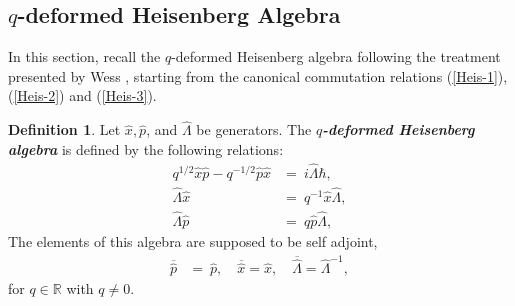 \documentclass[12pt,a4paper]{article}
\theoremstyle{plain}
\newtheorem{proposition}[theorem]{Proposition}
\theoremstyle{definition}
\newtheorem{definition}[theorem]{Definition}
\theoremstyle{remark}
\begin{document}
\subsection{\texorpdfstring{$q$}{Lg}-deformed Heisenberg Algebra}\label{juwess}

In this section, recall the $q$-deformed Heisenberg algebra following the treatment presented by Wess \cite{Wess2000}, starting from the canonical commutation relations (\ref{Heis-1}), (\ref{Heis-2}) and (\ref{Heis-3}).

\begin{definition}\cite{Wess2000}\label{Wess-def} Let $\hat{x},\hat{p}$, and $\hat{\Lambda}$ be generators. The \textit{\textbf{$q$-deformed Heisenberg algebra}} is defined by the following relations: 
\begin{align} \label{17}
q^{1/2}\hat{x}\hat{p}-q^{-1/2}\hat{p}\hat{x} & = \ i\hat{\Lambda}\hbar ,\\
\label{wess2}\hat{\Lambda} \hat{x} & = \ q^{-1}\hat{x}\hat{\Lambda}, \\
\label{wess3}\hat{\Lambda} \hat{p}  & = \ q\hat{p}\hat{\Lambda}, 
\end{align} 
The elements of this algebra are supposed to be
self adjoint, 
\begin{align}
    \label{wess4}\overline{\hat{p}} & = \ \hat{p},\quad  \overline{\hat{x}} = \hat{x}, \quad \overline{\hat{\Lambda}}=\hat{\Lambda}^{-1},
\end{align}
for $q\in\mathbb{R}$ with $q\neq 0$. 
\end{definition}

\end{document}
